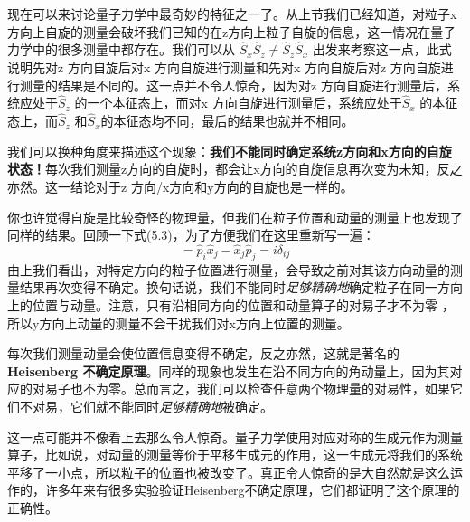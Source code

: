 现在可以来讨论量子力学中最奇妙的特征之一了。从上节我们已经知道，对粒子x方向上自旋的测量会破坏我们已知的在z方向上粒子自旋的信息，这一情况在量子力学中的很多测量中都存在。我们可以从 $\hat S_x \hat S_z \ne \hat S_z \hat S_x$ 出发来考察这一点，此式说明先对z 方向自旋后对x 方向自旋进行测量和先对x 方向自旋后对z 方向自旋进行测量的结果是不同的。这一点并不令人惊奇，因为对z 方向自旋进行测量后，系统应处于$\hat S_z$ 的一个本征态上，而对x 方向自旋进行测量后，系统应处于$\hat S_x$ 的本征态上，而$\hat S_z$ 和$\hat S_x$的本征态均不同，最后的结果也就并不相同。
\par
我们可以换种角度来描述这个现象：{\bf 我们不能同时确定系统z方向和x方向的自旋状态！}每次我们测量z方向的自旋时，都会让x方向的自旋信息再次变为未知，反之亦然。这一结论对于z 方向/x方向和y方向的自旋也是一样的。
\par
你也许觉得自旋是比较奇怪的物理量，但我们在粒子位置和动量的测量上也发现了同样的结果。回顾一下式(5.3)，为了方便我们在这里重新写一遍：
\begin{equation}
[\hat p_i,\hat x_j]=\hat p_i \hat x_j - \hat x_j \hat p_j =i \delta_{ij}
\end{equation}
由上我们看出，对特定方向的粒子位置进行测量，会导致之前对其该方向动量的测量结果再次变得不确定。换句话说，我们不能同时{\it 足够精确地}确定粒子在同一方向上的位置与动量。注意，只有沿相同方向的位置和动量算子的对易子才不为零
，所以y方向上动量的测量不会干扰我们对x方向上位置的测量。
\par
每次我们测量动量会使位置信息变得不确定，反之亦然，这就是著名的\textbf{Heisenberg 不确定原理}。同样的现象也发生在沿不同方向的角动量上，因为其对应的对易子也不为零。总而言之，我们可以检查任意两个物理量的对易性，如果它们不对易，它们就不能同时{\it 足够精确地}被确定。
\par
这一点可能并不像看上去那么令人惊奇。量子力学使用对应对称的生成元作为测量算子，比如说，对动量的测量等价于平移生成元的作用，这一生成元将我们的系统平移了一小点，所以粒子的位置也被改变了。真正令人惊奇的是大自然就是这么运作的，许多年来有很多实验验证Heisenberg不确定原理，它们都证明了这个原理的正确性。




